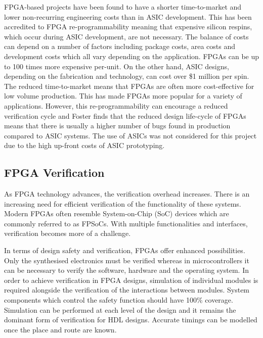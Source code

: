 FPGA-based projects have been found to have a shorter time-to-market and lower non-recurring engineering costs than in ASIC development\cite{Foster,DaSilva,Bernardeschi, Borcsok, baines}. This has been accredited to FPGA re-programmability meaning that expensive silicon respins, which occur during ASIC development, are not necessary\cite{Bernardeschi, Borcsok}. The balance of costs can depend on a number of factors including package costs, area costs and development costs which all vary depending on the application\cite{kuon, baines}. FPGAs can be up to 100 times more expensive per-unit\cite{baines}. On the other hand, ASIC designs, depending on the fabrication and technology, can cost over \$1 million per spin\cite{zahiri}.
The reduced time-to-market means that FPGAs are often more cost-effective for low volume production\cite{Foster,Bernardeschi}. This has made FPGAs more popular for a variety of applications\cite{DaSilva, Dubey}. However, this re-programmability can encourage a reduced verification cycle and Foster finds that the reduced design life-cycle of FPGAs means that there is usually a higher number of bugs found in production compared to ASIC systems\cite{Foster}. The use of ASICs was not considered for this project due to the high up-front costs of ASIC prototyping.


\subsection{FPGA Verification}

As FPGA technology advances, the verification overhead increases\cite{DaSilva, Drechsler}. There is an increasing need for efficient verification of the functionality of these systems\cite{Foster,Rodriguez}. Modern FPGAs often resemble System-on-Chip (SoC) devices which are commonly referred to as FPSoCs\cite{Rodriguez,Naouar,MonmassonFPGAsIndustrialControlApplications,Bernardeschi}. With multiple functionalities and interfaces, verification becomes more of a challenge\cite{Foster}.

In terms of design safety and verification, FPGAs offer enhanced possibilities\cite{SalewskiFaultHandling}. Only the synthesised electronics must be verified whereas in microcontrollers it can be necessary to verify the software, hardware and the operating system\cite{SalewskiFaultHandling}. In order to achieve verification in FPGA designs, simulation of individual modules is required alongside the verification of the interactions between modules\cite{SalewskiSystematic}. System components which control the safety function should have 100\% coverage\cite{Ceesay-Seitz}. Simulation can be performed at each level of the design\cite{SalewskiSystematic} and it remains the dominant form of verification for HDL designs\cite{SalewskiSystematic, Yun}. Accurate timings can be modelled once the place and route are known\cite{SalewskiSystematic}.


